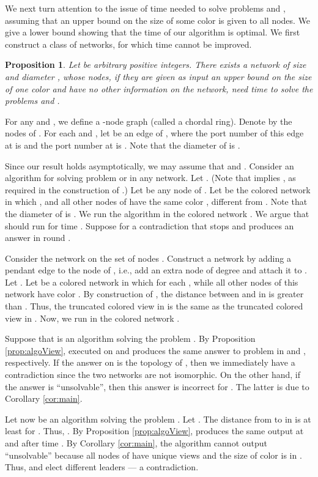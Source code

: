 \documentclass[a4paper,10pt]{article}
\newtheorem{proposition}{Proposition}[section]
\newenvironment{proof}[1][Proof]
{\par\noindent{\bf #1:} }{\hspace*{\fill}\nolinebreak{}\bigskip\par}
\begin{document}
We next turn attention to the issue of time needed to solve problems  and , assuming that an upper bound  on the size of some color is given to all nodes.  We give a lower bound showing that the time
 of our algorithm is optimal.
We first construct a class of networks, for which
time  cannot be improved.

 
\begin{proposition}\label{first-lb}
Let  be arbitrary positive integers.
There exists a network of size  and diameter , whose nodes, if they are given as input an upper bound  on the size of one color  and have no other information on the network, need time   to solve the problems  and .
\end{proposition}
\begin{proof}
For any  and , we define a -node graph  (called a chordal ring).
Denote by  the nodes of .
For each  and , let  be an edge of , where the port number of this edge at  is  and the port number at  is .
Note that the diameter of  is .

Since our result {holds asymptotically}, we may assume that  and .
Consider an algorithm  for solving problem  or  in any network.
Let .
(Note that  implies , as required in the construction of .)
Let  be any node of .
Let  be the colored network in which , and all other nodes of  have the same color , different from .
Note that the diameter of  is .
We run the algorithm  in the colored network .
We argue that  should run for time .
Suppose for a contradiction that  stops and produces an answer in round .

Consider the network  on the set of nodes .
Construct a network  by adding a pendant edge to the node  of , i.e., add an extra node of degree  and attach it to .
Let .
Let  be a colored network in which  for each , while all other nodes of this network have color .
By construction of , the distance between  and  in  is greater than .
Thus, the truncated colored view  in  is the same as the truncated colored view  in .
Now, we run  in the colored network .

Suppose that  is an algorithm solving the problem .
By Proposition \ref{prop:algoView},  executed on  and  produces the same answer to problem  in  and , respectively.
If the answer on  is the topology of , then we immediately have a contradiction since the two networks are not isomorphic.
On the other hand, if the answer is ``unsolvable'', then this answer is incorrect for .
The latter is due to Corollary \ref{cor:main}.

Let now  be an algorithm solving the problem .
Let .
The distance from  to  in  is at least  for .
Thus, .
By Proposition \ref{prop:algoView},  produces the same output at  and  after time .
By Corollary \ref{cor:main}, the algorithm  cannot output ``unsolvable'' because all nodes of  have unique views and the size of color  is  in .
Thus,  and  elect different leaders --- a contradiction.
\end{proof}
\end{document}
